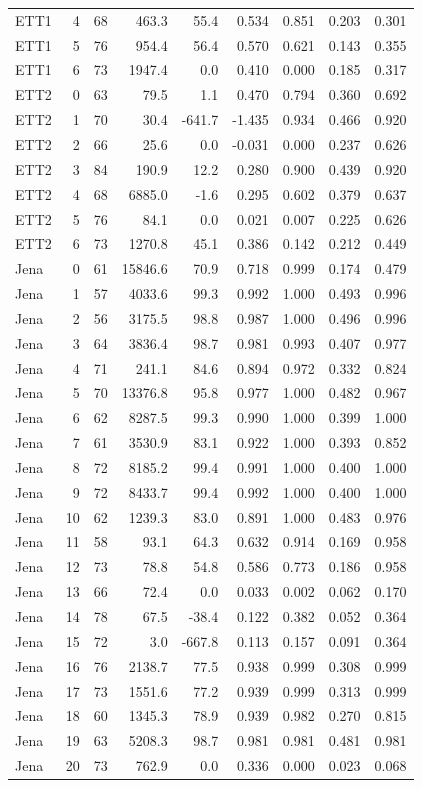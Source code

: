 \begin{longtable}{lrrrrrrrr}
ETT1 & 4 & 68 & 463.3 & 55.4 & 0.534 & 0.851 & 0.203 & 0.301 \\
ETT1 & 5 & 76 & 954.4 & 56.4 & 0.570 & 0.621 & 0.143 & 0.355 \\
ETT1 & 6 & 73 & 1947.4 & 0.0 & 0.410 & 0.000 & 0.185 & 0.317 \\
ETT2 & 0 & 63 & 79.5 & 1.1 & 0.470 & 0.794 & 0.360 & 0.692 \\
ETT2 & 1 & 70 & 30.4 & -641.7 & -1.435 & 0.934 & 0.466 & 0.920 \\
ETT2 & 2 & 66 & 25.6 & 0.0 & -0.031 & 0.000 & 0.237 & 0.626 \\
ETT2 & 3 & 84 & 190.9 & 12.2 & 0.280 & 0.900 & 0.439 & 0.920 \\
ETT2 & 4 & 68 & 6885.0 & -1.6 & 0.295 & 0.602 & 0.379 & 0.637 \\
ETT2 & 5 & 76 & 84.1 & 0.0 & 0.021 & 0.007 & 0.225 & 0.626 \\
ETT2 & 6 & 73 & 1270.8 & 45.1 & 0.386 & 0.142 & 0.212 & 0.449 \\
Jena & 0 & 61 & 15846.6 & 70.9 & 0.718 & 0.999 & 0.174 & 0.479 \\
Jena & 1 & 57 & 4033.6 & 99.3 & 0.992 & 1.000 & 0.493 & 0.996 \\
Jena & 2 & 56 & 3175.5 & 98.8 & 0.987 & 1.000 & 0.496 & 0.996 \\
Jena & 3 & 64 & 3836.4 & 98.7 & 0.981 & 0.993 & 0.407 & 0.977 \\
Jena & 4 & 71 & 241.1 & 84.6 & 0.894 & 0.972 & 0.332 & 0.824 \\
Jena & 5 & 70 & 13376.8 & 95.8 & 0.977 & 1.000 & 0.482 & 0.967 \\
Jena & 6 & 62 & 8287.5 & 99.3 & 0.990 & 1.000 & 0.399 & 1.000 \\
Jena & 7 & 61 & 3530.9 & 83.1 & 0.922 & 1.000 & 0.393 & 0.852 \\
Jena & 8 & 72 & 8185.2 & 99.4 & 0.991 & 1.000 & 0.400 & 1.000 \\
Jena & 9 & 72 & 8433.7 & 99.4 & 0.992 & 1.000 & 0.400 & 1.000 \\
Jena & 10 & 62 & 1239.3 & 83.0 & 0.891 & 1.000 & 0.483 & 0.976 \\
Jena & 11 & 58 & 93.1 & 64.3 & 0.632 & 0.914 & 0.169 & 0.958 \\
Jena & 12 & 73 & 78.8 & 54.8 & 0.586 & 0.773 & 0.186 & 0.958 \\
Jena & 13 & 66 & 72.4 & 0.0 & 0.033 & 0.002 & 0.062 & 0.170 \\
Jena & 14 & 78 & 67.5 & -38.4 & 0.122 & 0.382 & 0.052 & 0.364 \\
Jena & 15 & 72 & 3.0 & -667.8 & 0.113 & 0.157 & 0.091 & 0.364 \\
Jena & 16 & 76 & 2138.7 & 77.5 & 0.938 & 0.999 & 0.308 & 0.999 \\
Jena & 17 & 73 & 1551.6 & 77.2 & 0.939 & 0.999 & 0.313 & 0.999 \\
Jena & 18 & 60 & 1345.3 & 78.9 & 0.939 & 0.982 & 0.270 & 0.815 \\
Jena & 19 & 63 & 5208.3 & 98.7 & 0.981 & 0.981 & 0.481 & 0.981 \\
Jena & 20 & 73 & 762.9 & 0.0 & 0.336 & 0.000 & 0.023 & 0.068 \\
\bottomrule
\end{longtable}
